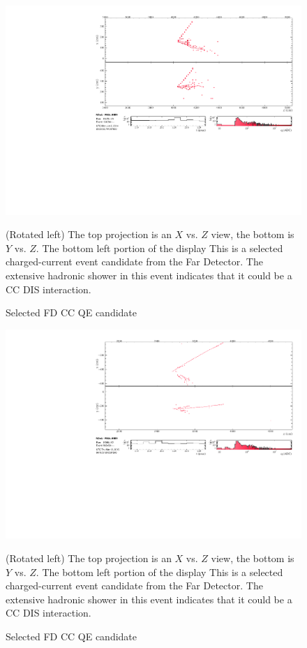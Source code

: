 \begin{figure}
\begin{center}
\vspace{-35pt}

\includegraphics[width=0.87\textheight, angle=90]{figures/results/evd/evd_xzyx-proj_15470_124284.pdf}
\end{center}
\caption{Selected FD \numu CC QE candidate}{
(Rotated left) The top projection is an $X$ vs. $Z$
view, the bottom is $Y$ vs. $Z$.
The bottom left portion of the display
This is a selected \numu charged-current event candidate from the
Far Detector.
The extensive hadronic shower in this event indicates that it could be
a CC DIS interaction.}
\label{evd_dis_1}
\end{figure}

\begin{figure}
\begin{center}
\vspace{-35pt}

\includegraphics[width=0.87\textheight, angle=90]{figures/results/evd/evd_xzyx-proj_19084_908450.pdf}
\end{center}
\caption{Selected FD \numu CC QE candidate}{
(Rotated left) The top projection is an $X$ vs. $Z$
view, the bottom is $Y$ vs. $Z$.
The bottom left portion of the display
This is a selected \numu charged-current event candidate from the
Far Detector.
The extensive hadronic shower in this event indicates that it could be
a CC DIS interaction.}
\label{evd_dis_2}
\end{figure}


